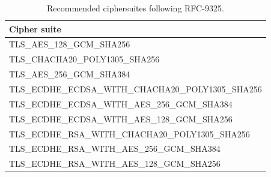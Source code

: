 \begin{table}[tb]
\small
\centering
\caption{Recommended ciphersuites following RFC-9325.}
\begin{tabular}{l}
\hline
\textbf{Cipher suite}\\
\hline
TLS\_AES\_128\_GCM\_SHA256 \\
TLS\_CHACHA20\_POLY1305\_SHA256 \\
TLS\_AES\_256\_GCM\_SHA384 \\
TLS\_ECDHE\_ECDSA\_WITH\_CHACHA20\_POLY1305\_SHA256 \\
TLS\_ECDHE\_ECDSA\_WITH\_AES\_256\_GCM\_SHA384 \\
TLS\_ECDHE\_ECDSA\_WITH\_AES\_128\_GCM\_SHA256 \\
TLS\_ECDHE\_RSA\_WITH\_CHACHA20\_POLY1305\_SHA256 \\
TLS\_ECDHE\_RSA\_WITH\_AES\_256\_GCM\_SHA384 \\
TLS\_ECDHE\_RSA\_WITH\_AES\_128\_GCM\_SHA256 \\
\hline
\end{tabular}
\label{tab:tls_ciphersuite}
\end{table}
